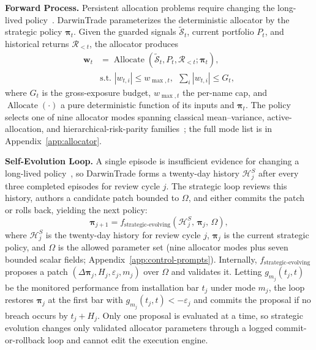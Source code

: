 \documentclass[letterpaper]{article}
\begin{document}
\textbf{Forward Process.}\quad
Persistent allocation problems require changing the long-lived
policy~\citep{tian2025tradinggroup,chen2025threestrader}. DarwinTrade
parameterizes the deterministic allocator by the strategic policy
$\boldsymbol{\pi}_t$. Given the guarded signals
$\widetilde{\mathcal{S}}_t$, current portfolio $P_t$, and historical
returns $\mathcal{R}_{<t}$, the allocator produces
\begin{equation}
\begin{aligned}
\boldsymbol{w}_t&=\operatorname{Allocate}\!\left(
    \widetilde{\mathcal{S}}_t,P_t,\mathcal{R}_{<t};\boldsymbol{\pi}_t\right),\\
&\text{s.t. } |w_{t,i}|\leq w_{\max,t},\ \ \textstyle\sum_i|w_{t,i}|\leq G_t,
\end{aligned}
\label{eq:strategic-allocation}
\end{equation}
where $G_t$ is the gross-exposure budget, $w_{\max,t}$ the per-name cap,
and $\operatorname{Allocate}(\cdot)$ a pure deterministic function of its
inputs and $\boldsymbol{\pi}_t$. The policy selects one of nine allocator
modes spanning classical mean--variance, active-allocation, and
hierarchical-risk-parity
families~\citep{markowitz1952portfolio,grinold2000active,lopezdeprado2016hrp};
the full mode list is in Appendix~\ref{app:allocator}.

\textbf{Self-Evolution Loop.}\quad
A single episode is insufficient evidence for changing a long-lived
policy~\citep{rashid2026finanalyst,qu2026clqt}, so DarwinTrade forms a
twenty-day history $\mathcal{H}^S_j$ after every three completed
episodes for review cycle $j$. The strategic loop reviews this history,
authors a candidate patch bounded to $\Omega$, and either commits the
patch or rolls back, yielding the next policy:
\begin{equation}
\boldsymbol{\pi}_{j+1}
  = f_{\text{strategic-evolving}}(\mathcal{H}^S_j,\,
    \boldsymbol{\pi}_j,\, \Omega),
\label{eq:strategic-evolving}
\end{equation}
where $\mathcal{H}^S_j$ is the twenty-day history for review cycle $j$,
$\boldsymbol{\pi}_j$ is the current strategic policy, and $\Omega$ is
the allowed parameter set (nine allocator modes plus seven bounded
scalar fields; Appendix~\ref{app:control-prompts}). Internally,
$f_{\text{strategic-evolving}}$ proposes a patch $(\Delta\boldsymbol{
\pi}_j,H_j,\varepsilon_j,m_j)$ over $\Omega$ and validates it. Letting
$g_{m_j}(t_j,t)$ be the monitored performance from installation bar
$t_j$ under mode $m_j$, the loop restores $\boldsymbol{\pi}_j$ at the
first bar with $g_{m_j}(t_j,t)<-\varepsilon_j$ and commits the proposal
if no breach occurs by $t_j+H_j$. Only one proposal is evaluated at a
time, so strategic evolution changes only validated allocator
parameters through a logged commit-or-rollback loop and cannot edit
the execution engine.
\end{document}
